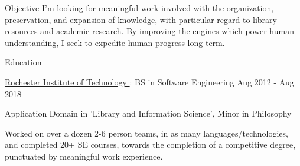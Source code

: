 \documentclass{resume} %
\begin{document}
  \begin{rSection}{Objective}
    I'm looking for meaningful work involved with the organization, preservation, and expansion of knowledge, with particular regard to library resources and academic research. By improving the engines which power human understanding, I seek to expedite human progress long-term.
  \end{rSection}

  \begin{rSection}{Education}

    \begin{rSubsection}{\underline{Rochester Institute of Technology }: BS in Software Engineering }{ Aug 2012 - Aug 2018 }{}

      \item Application Domain in 'Library and Information Science', Minor in Philosophy

      \item Worked on over a dozen 2-6 person teams, in as many languages/technologies, and completed 20+ SE courses, towards the completion of a competitive degree, punctuated by meaningful work experience.

    \end{rSubsection}

  \end{rSection}
\end{document}
